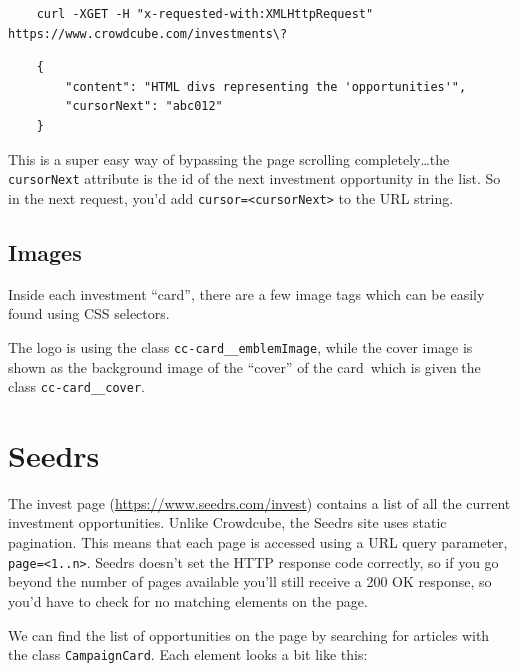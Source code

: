 \documentclass{article}
\begin{document}
\begin{verbatim}
    curl -XGET -H "x-requested-with:XMLHttpRequest" https://www.crowdcube.com/investments\?
\end{verbatim}

\begin{verbatim}
    {
        "content": "HTML divs representing the 'opportunities'",
        "cursorNext": "abc012"
    }
\end{verbatim}

This is a super easy way of bypassing the page scrolling completely\ldots the
\texttt{cursorNext} attribute is the id of the next investment opportunity in
the list. So in the next request, you'd add \texttt{cursor=<cursorNext>} to the
URL string.

\subsection*{Images}
Inside each investment ``card'', there are a few image tags which can be easily
found using CSS selectors.

The logo is using the class \texttt{cc-card\_\_emblemImage}, while the cover
image is shown as the background image of the ``cover'' of the
card\textemdash~which is given the class \texttt{cc-card\_\_cover}.

\section*{Seedrs}
The invest page (\url{https://www.seedrs.com/invest}) contains a list of all the
current investment opportunities. Unlike Crowdcube, the Seedrs site uses static
pagination. This means that each page is accessed using a URL query parameter,
\texttt{page=<1..n>}. Seedrs doesn't set the HTTP response code correctly, so if
you go beyond the number of pages available you'll still receive a 200 OK
response, so you'd have to check for no matching elements on the page.

We can find the list of opportunities on the page by searching for articles with
the class \texttt{CampaignCard}. Each element looks a bit like this:
\end{document}
